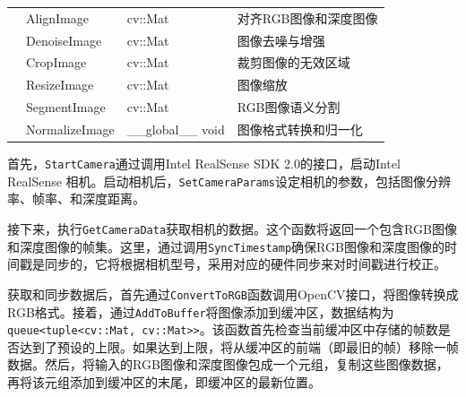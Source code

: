 \begin{table}[htb]
\begin{tabular}{|l|m{3.5cm}|m{3.5cm}|m{5cm}|}
		                                           & \centering\arraybackslash AlignImage            & \centering\arraybackslash cv::Mat             & \centering\arraybackslash 对齐RGB图像和深度图像  \\ \cline{2-4}
		                                           & \centering\arraybackslash DenoiseImage          & \centering\arraybackslash cv::Mat             & \centering\arraybackslash 图像去噪与增强       \\ \cline{2-4}
		                                           & \centering\arraybackslash CropImage             & \centering\arraybackslash cv::Mat             & \centering\arraybackslash 裁剪图像的无效区域     \\ \cline{2-4}
		                                           & \centering\arraybackslash ResizeImage           & \centering\arraybackslash cv::Mat             & \centering\arraybackslash 图像缩放          \\ \cline{2-4}
		                                           & \centering\arraybackslash SegmentImage          & \centering\arraybackslash cv::Mat             & \centering\arraybackslash RGB图像语义分割     \\ \cline{2-4}
		                                           & \centering\arraybackslash NormalizeImage        & \centering\arraybackslash \_\_global\_\_ void & \centering\arraybackslash 图像格式转换和归一化    \\ \hline
	\end{tabular}
\end{table}

\par 首先，\texttt{StartCamera}通过调用Intel RealSense SDK 2.0的接口，启动Intel RealSense 相机。启动相机后，\texttt{SetCameraParams}设定相机的参数，包括图像分辨率、帧率、和深度距离。

\par 接下来，执行\texttt{GetCameraData}获取相机的数据。这个函数将返回一个包含RGB图像和深度图像的帧集。这里，通过调用\texttt{SyncTimestamp}确保RGB图像和深度图像的时间戳是同步的，它将根据相机型号，采用对应的硬件同步来对时间戳进行校正。

\par 获取和同步数据后，首先通过\texttt{ConvertToRGB}函数调用OpenCV接口，将图像转换成RGB格式。接着，通过\texttt{AddToBuffer}将图像添加到缓冲区，数据结构为\texttt{queue<tuple<cv::Mat, cv::Mat>>}。该函数首先检查当前缓冲区中存储的帧数是否达到了预设的上限。如果达到上限，将从缓冲区的前端（即最旧的帧）移除一帧数据。然后，将输入的RGB图像和深度图像包成一个元组，复制这些图像数据，再将该元组添加到缓冲区的末尾，即缓冲区的最新位置。

